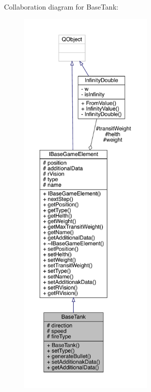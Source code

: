 Collaboration diagram for Base\+Tank\+:
\nopagebreak
\begin{figure}[H]
\begin{center}
\leavevmode
\includegraphics[height=550pt]{d3/df8/a00155}
\end{center}
\end{figure}
